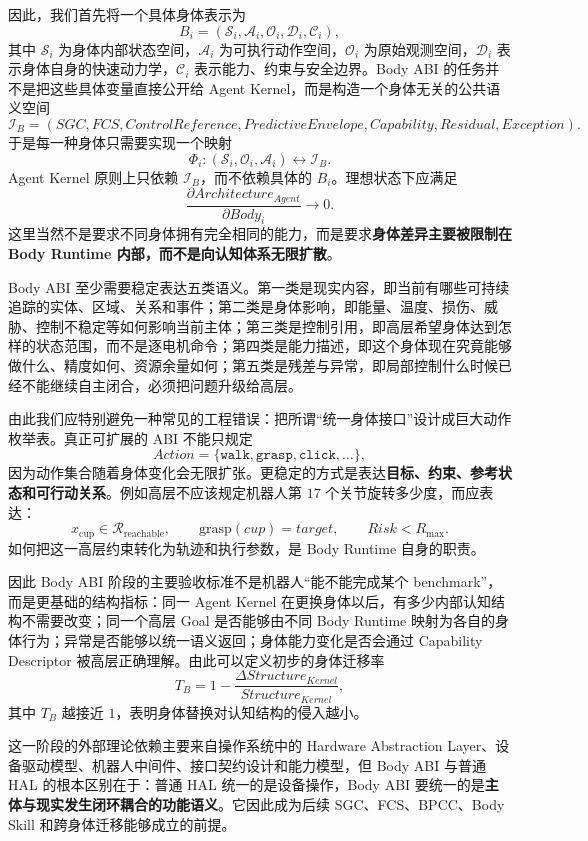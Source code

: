 因此，我们首先将一个具体身体表示为
\[
B_i=
\left(
\mathcal S_i,
\mathcal A_i,
\mathcal O_i,
\mathcal D_i,
\mathcal C_i
\right),
\]
其中 $\mathcal S_i$ 为身体内部状态空间，$\mathcal A_i$ 为可执行动作空间，$\mathcal O_i$ 为原始观测空间，$\mathcal D_i$ 表示身体自身的快速动力学，$\mathcal C_i$ 表示能力、约束与安全边界。Body ABI 的任务并不是把这些具体变量直接公开给 Agent Kernel，而是构造一个身体无关的公共语义空间
\[
\mathcal I_B
=
\left(
SGC,
FCS,
ControlReference,
PredictiveEnvelope,
Capability,
Residual,
Exception
\right).
\]
于是每一种身体只需要实现一个映射
\[
\Phi_i:
(\mathcal S_i,\mathcal O_i,\mathcal A_i)
\longleftrightarrow
\mathcal I_B.
\]
Agent Kernel 原则上只依赖 $\mathcal I_B$，而不依赖具体的 $B_i$。理想状态下应满足
\[
\frac{\partial Architecture_{Agent}}
{\partial Body_i}
\rightarrow 0.
\]
这里当然不是要求不同身体拥有完全相同的能力，而是要求\textbf{身体差异主要被限制在 Body Runtime 内部，而不是向认知体系无限扩散}。

Body ABI 至少需要稳定表达五类语义。第一类是现实内容，即当前有哪些可持续追踪的实体、区域、关系和事件；第二类是身体影响，即能量、温度、损伤、威胁、控制不稳定等如何影响当前主体；第三类是控制引用，即高层希望身体达到怎样的状态范围，而不是逐电机命令；第四类是能力描述，即这个身体现在究竟能够做什么、精度如何、资源余量如何；第五类是残差与异常，即局部控制什么时候已经不能继续自主闭合，必须把问题升级给高层。

由此我们应特别避免一种常见的工程错误：把所谓“统一身体接口”设计成巨大动作枚举表。真正可扩展的 ABI 不能只规定
\[
Action=\{\texttt{walk},\texttt{grasp},\texttt{click},\ldots\},
\]
因为动作集合随着身体变化会无限扩张。更稳定的方式是表达\textbf{目标、约束、参考状态和可行动关系}。例如高层不应该规定机器人第 $17$ 个关节旋转多少度，而应表达：
\[
x_{\mathrm{cup}}
\in
\mathcal R_{\mathrm{reachable}},
\qquad
\text{grasp}(cup)
=
target,
\qquad
Risk<R_{\max}.
\]
如何把这一高层约束转化为轨迹和执行参数，是 Body Runtime 自身的职责。

因此 Body ABI 阶段的主要验收标准不是机器人“能不能完成某个 benchmark”，而是更基础的结构指标：同一 Agent Kernel 在更换身体以后，有多少内部认知结构不需要改变；同一个高层 Goal 是否能够由不同 Body Runtime 映射为各自的身体行为；异常是否能够以统一语义返回；身体能力变化是否会通过 Capability Descriptor 被高层正确理解。由此可以定义初步的身体迁移率
\[
T_B
=
1-
\frac{
\Delta Structure_{Kernel}
}{
Structure_{Kernel}
},
\]
其中 $T_B$ 越接近 $1$，表明身体替换对认知结构的侵入越小。

这一阶段的外部理论依赖主要来自操作系统中的 Hardware Abstraction Layer、设备驱动模型、机器人中间件、接口契约设计和能力模型，但 Body ABI 与普通 HAL 的根本区别在于：普通 HAL 统一的是设备操作，Body ABI 要统一的是\textbf{主体与现实发生闭环耦合的功能语义}。它因此成为后续 SGC、FCS、BPCC、Body Skill 和跨身体迁移能够成立的前提。

